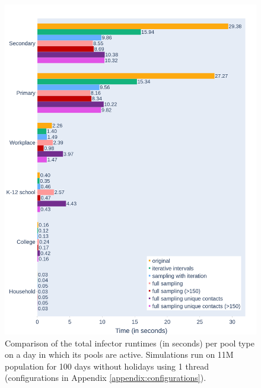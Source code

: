 \begin{figure}
    \centering
    \includegraphics[width=\linewidth]{4 - Sampling/fig/full_sampling_unique_contacts/fsuc_pSize_vs_rest_type_totals.png}
    \caption{Comparison of the total infector runtimes (in seconds) per pool type on a day in which its pools are active. Simulations run on 11M population for 100 days without holidays using 1 thread (configurations in Appendix \ref{appendix:configurations}).}
    \label{fig:fsuc_pSize_vs_rest_type_totals}
\end{figure}

